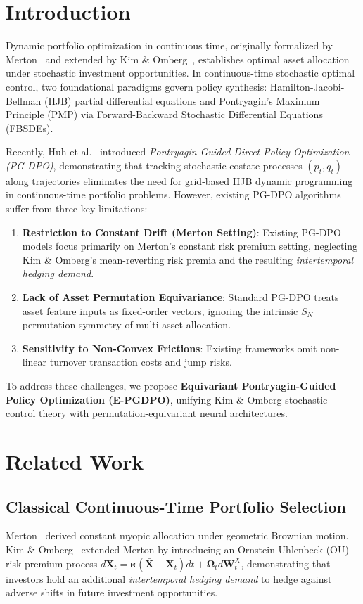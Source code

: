 \documentclass[11pt,a4paper]{article}
\theoremstyle{plain}
\theoremstyle{definition}
\theoremstyle{remark}
\begin{document}
\section{Introduction}
Dynamic portfolio optimization in continuous time, originally formalized by Merton~\cite{merton1969lifetime, merton1971optimum} and extended by Kim \& Omberg~\cite{kim1996non}, establishes optimal asset allocation under stochastic investment opportunities. In continuous-time stochastic optimal control, two foundational paradigms govern policy synthesis: Hamilton-Jacobi-Bellman (HJB) partial differential equations and Pontryagin's Maximum Principle (PMP) via Forward-Backward Stochastic Differential Equations (FBSDEs).

Recently, Huh et al.~\cite{huh2024pontryagin, huh2025breaking} introduced \emph{Pontryagin-Guided Direct Policy Optimization (PG-DPO)}, demonstrating that tracking stochastic costate processes $(p_t, q_t)$ along trajectories eliminates the need for grid-based HJB dynamic programming in continuous-time portfolio problems. However, existing PG-DPO algorithms suffer from three key limitations:
\begin{enumerate}
    \item \textbf{Restriction to Constant Drift (Merton Setting)}: Existing PG-DPO models focus primarily on Merton's constant risk premium setting, neglecting Kim \& Omberg's mean-reverting risk premia and the resulting \emph{intertemporal hedging demand}.
    \item \textbf{Lack of Asset Permutation Equivariance}: Standard PG-DPO treats asset feature inputs as fixed-order vectors, ignoring the intrinsic $S_N$ permutation symmetry of multi-asset allocation.
    \item \textbf{Sensitivity to Non-Convex Frictions}: Existing frameworks omit non-linear turnover transaction costs and jump risks.
\end{enumerate}

To address these challenges, we propose \textbf{Equivariant Pontryagin-Guided Policy Optimization (E-PGDPO)}, unifying Kim \& Omberg stochastic control theory with permutation-equivariant neural architectures.

\section{Related Work}

\subsection{Classical Continuous-Time Portfolio Selection}
Merton~\cite{merton1969lifetime} derived constant myopic allocation under geometric Brownian motion. Kim \& Omberg~\cite{kim1996non} extended Merton by introducing an Ornstein-Uhlenbeck (OU) risk premium process $d\mathbf{X}_t = \mathbf{\kappa}(\bar{\mathbf{X}} - \mathbf{X}_t)dt + \mathbf{\Omega}_t d\mathbf{W}_t^X$, demonstrating that investors hold an additional \emph{intertemporal hedging demand} to hedge against adverse shifts in future investment opportunities.
\end{document}
